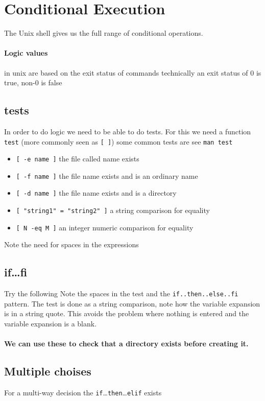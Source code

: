 \documentclass[12pt,a4paper]{article}
\begin{document}
\section{Conditional Execution}
The Unix shell gives us the full range of conditional operations.

\paragraph{Logic values} in unix are based on the exit status of
commands technically an exit status of 0 is true, non-0 is
  false

\subsection{tests}
In order to do logic we need to be able to do tests.  For this we need
a function \texttt{test} (more commonly seen as \texttt{[ ]}) some
common tests are see \texttt{man test}
\begin{itemize}
\item \verb*:[ -e name ]: the file called name exists
\item \verb*:[ -f name ]: the file name exists and is an ordinary name
\item \verb*:[ -d name ]: the file name exists and is a directory
\item \verb*:[ "string1" = "string2" ]: a string comparison for equality
\item \verb*:[ N -eq M ]: an integer numeric comparison for equality
\end{itemize}
Note the need for spaces in the expressions

\subsection{if\ldots fi}
Try the following
Note the spaces in the test and the \texttt{if..then..else..fi}
pattern.  The test is done as a string comparison, note how the
variable expansion is in a string quote.  This avoids the problem
where nothing is entered and the variable expansion is a blank.

\paragraph{We can use these to check that a directory exists before creating it.}

\subsection{Multiple choises}
For a multi-way decision the
\texttt{if}\ldots\texttt{then}\ldots\texttt{elif} exists
\end{document}

